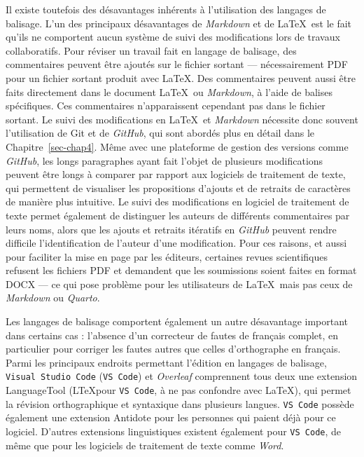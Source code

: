 \documentclass[
  letterpaper,
  DIV=11,
  numbers=noendperiod,
  oneside]{scrreprt}
\begin{document}
Il existe toutefois des désavantages inhérents à l'utilisation des
langages de balisage. L'un des principaux désavantages de
\emph{Markdown} et de \LaTeX{}~est le fait qu'ils ne comportent aucun
système de suivi des modifications lors de travaux collaboratifs. Pour
réviser un travail fait en langage de balisage, des commentaires peuvent
être ajoutés sur le fichier sortant --- nécessairement PDF pour un
fichier sortant produit avec \LaTeX{}. Des commentaires peuvent aussi
être faits directement dans le document \LaTeX{}~ou \emph{Markdown}, à
l'aide de balises spécifiques. Ces commentaires n'apparaissent cependant
pas dans le fichier sortant. Le suivi des modifications en \LaTeX{}~et
\emph{Markdown} nécessite donc souvent l'utilisation de Git et de
\emph{GitHub}, qui sont abordés plus en détail dans le
Chapitre~\ref{sec-chap4}. Même avec une plateforme de gestion des
versions comme \emph{GitHub}, les longs paragraphes ayant fait l'objet
de plusieurs modifications peuvent être longs à comparer par rapport aux
logiciels de traitement de texte, qui permettent de visualiser les
propositions d'ajouts et de retraits de caractères de manière plus
intuitive. Le suivi des modifications en logiciel de traitement de texte
permet également de distinguer les auteurs de différents commentaires
par leurs noms, alors que les ajouts et retraits itératifs en
\emph{GitHub} peuvent rendre difficile l'identification de l'auteur
d'une modification. Pour ces raisons, et aussi pour faciliter la mise en
page par les éditeurs, certaines revues scientifiques refusent les
fichiers PDF et demandent que les soumissions soient faites en format
DOCX --- ce qui pose problème pour les utilisateurs de \LaTeX{}~mais pas
ceux de \emph{Markdown} ou \emph{Quarto}.

Les langages de balisage comportent également un autre désavantage
important dans certains cas : l'absence d'un correcteur de fautes de
français complet, en particulier pour corriger les fautes autres que
celles d'orthographe en français. Parmi les principaux endroits
permettant l'édition en langages de balisage,
\texttt{Visual\ Studio\ Code} (\texttt{VS\ Code}) et \emph{Overleaf}
comprennent tous deux une extension LanguageTool (L\TeX pour
\texttt{VS\ Code}, à ne pas confondre avec \LaTeX{}), qui permet la
révision orthographique et syntaxique dans plusieurs langues.
\texttt{VS\ Code} possède également une extension Antidote pour les
personnes qui paient déjà pour ce logiciel. D'autres extensions
linguistiques existent également pour \texttt{VS\ Code}, de même que
pour les logiciels de traitement de texte comme \emph{Word}.
\end{document}
